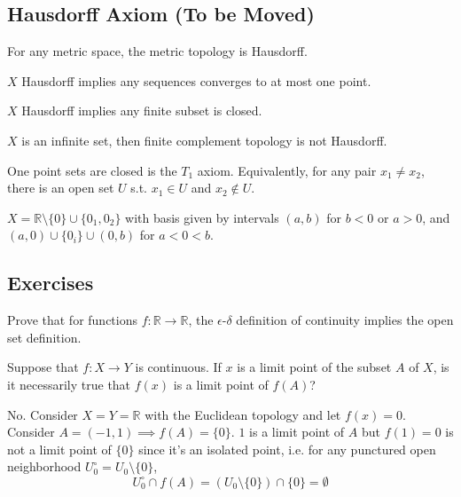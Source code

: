 \subsection{Hausdorff Axiom (To be Moved)} 

  \begin{lemma} 
    For any metric space, the metric topology is Hausdorff. 
  \end{lemma}

  \begin{lemma} 
    $X$ Hausdorff implies any sequences converges to at most one point. 
  \end{lemma}

  \begin{lemma} 
    $X$ Hausdorff implies any finite subset is closed. 
  \end{lemma}

  \begin{example}
    $X$ is an infinite set, then finite complement topology is not Hausdorff. 
  \end{example} 

  \begin{definition}
    One point sets are closed is the $T_1$ axiom. Equivalently, for any pair $x_1 \neq x_2$, there is an open set $U$ s.t. $x_1 \in U$ and $x_2 \not\in U$. 
  \end{definition}

  \begin{example}
    $X = \mathbb{R} \setminus \{0\} \cup \{0_1, 0_2\}$ with basis given by intervals $(a, b)$ for $b < 0$ or $a > 0$, and $(a, 0) \cup \{0_i\} \cup (0, b)$ for $a < 0 < b$. 
  \end{example}

\subsection{Exercises}

  \begin{exercise}[Munkres 18.1]
    Prove that for functions $f : \mathbb{R} \to \mathbb{R}$, the $\epsilon$-$\delta$ definition of continuity implies the open set definition.
  \end{exercise}

  \begin{exercise}[Munkres 18.2]
    Suppose that $f : X \to Y$ is continuous. If $x$ is a limit point of the subset $A$ of $X$, is it necessarily true that $f(x)$ is a limit point of $f(A)$?
  \end{exercise}
  \begin{solution}
    No. Consider $X = Y = \mathbb{R}$ with the Euclidean topology and let $f(x) = 0$. Consider $A = (-1, 1) \implies f(A) = \{0\}$. $1$ is a limit point of $A$ but $f(1) = 0$ is not a limit point of $\{0\}$ since it's an isolated point, i.e. for any punctured open neighborhood $U_0^\circ = U_0 \setminus \{0\}$, 
    \begin{equation}
      U_0^\circ \cap f(A) = (U_0 \setminus \{0\}) \cap \{0\} = \emptyset
    \end{equation}
  \end{solution}

